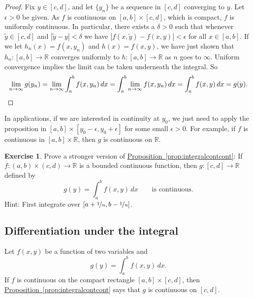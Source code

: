 \documentclass[12pt,openany]{book}
\newcommand{\abs}[1]{\left\lvert {#1} \right\rvert}
\newcommand{\R}{{\mathbb{R}}}
\theoremstyle{plain}
\theoremstyle{remark}
\theoremstyle{definition}
\newenvironment{exbox}{%
    \def\FrameCommand{\vrule width 1pt \relax\hspace{10pt}}%
    \MakeFramed{\advance\hsize-\width\FrameRestore}%
}{%
    \endMakeFramed
}
\theoremstyle{exercise}
\newtheorem{exercise}{Exercise}[section]
\theoremstyle{example}
\newcommand{\propref}[1]{\hyperref[#1]{Proposition~\ref*{#1}}}
\begin{document}
\begin{proof}
Fix $y \in [c,d]$, and let $\{ y_n \}$ be a sequence in $[c,d]$
converging to $y$.
Let $\epsilon > 0$ be given.
As $f$ is continuous on $[a,b] \times [c,d]$, which is compact, $f$
is uniformly continuous.  
In particular, there exists a $\delta > 0$ such that
whenever $\widetilde{y} \in [c,d]$ and
$\abs{\widetilde{y}-y} < \delta$ we have
$\abs{f(x,\widetilde{y})-f(x,y)} < \epsilon$ for all $x \in [a,b]$.
If we let $h_n(x)= f(x,y_n)$ and $h(x) = f(x,y)$,
we have just shown that
$h_n \colon [a,b] \to \R$ converges uniformly 
to
$h \colon [a,b] \to \R$ as $n$ goes to $\infty$.
Uniform convergence implies the limit can be taken underneath the integral.
So
\begin{equation*}
\lim_{n\to \infty}
g(y_n)
=
\lim_{n\to \infty}
\int_a^b 
f(x,y_n) \,dx 
= 
\int_a^b 
\lim_{n\to \infty}
f(x,y_n) \,dx 
= 
\int_a^b 
f(x,y) \,dx = g(y) . \qedhere
\end{equation*}
\end{proof}

In applications, if we are interested in continuity at $y_0$, we just
need to apply the proposition in $[a,b] \times [y_0-\epsilon,y_0+\epsilon]$
for some small $\epsilon > 0$.  For example, if $f$ is continuous in
$[a,b] \times \R$, then $g$ is continuous on $\R$.

\begin{exbox}
\begin{exercise} \label{exercise:integralcontcontextra}
Prove a stronger version of \propref{prop:integralcontcont}:
If $f \colon (a,b) \times (c,d) \to \R$ is a bounded continuous function,
then $g \colon [c,d] \to \R$ defined by
\begin{equation*}
g(y) = \int_a^b f(x,y) \,dx  \qquad \text{is continuous}.
\end{equation*}
Hint: First integrate over $[a+\nicefrac{1}{n},b-\nicefrac{1}{n}]$.
\end{exercise}
\end{exbox}

\subsection{Differentiation under the integral}
\label{subsec:diffunderint}

Let $f(x,y)$ be a function of two variables and
\begin{equation*}
g(y) = \int_a^b f(x,y) \,dx .
\end{equation*}
If $f$ is continuous on the compact rectangle $[a,b] \times [c,d]$, then
\propref{prop:integralcontcont}
says that $g$ is continuous on $[c,d]$.
\end{document}
